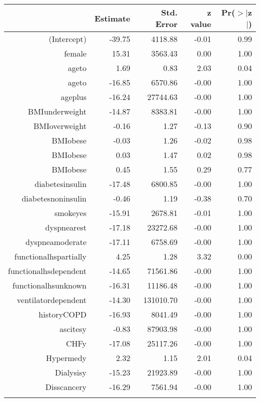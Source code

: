 \bigskip\bigskip
\centering
\begin{tabular}{rrrrr}
  \hline
 & Estimate & Std. Error & z value & Pr($>$$|$z$|$) \\ 
  \hline
(Intercept) & -39.75 & 4118.88 & -0.01 & 0.99 \\ 
  female & 15.31 & 3563.43 & 0.00 & 1.00 \\ 
  age\-65\-to\-74 & 1.69 & 0.83 & 2.03 & 0.04 \\ 
  age\-75\-to\-84 & -16.85 & 6570.86 & -0.00 & 1.00 \\ 
  age\-85\-plus & -16.24 & 27744.63 & -0.00 & 1.00 \\ 
  BMI\-underweight & -14.87 & 8383.81 & -0.00 & 1.00 \\ 
  BMI\-overweight & -0.16 & 1.27 & -0.13 & 0.90 \\ 
  BMI\-obese\-1 & -0.03 & 1.26 & -0.02 & 0.98 \\ 
  BMI\-obese\-2 & 0.03 & 1.47 & 0.02 & 0.98 \\ 
  BMI\-obese\-3 & 0.45 & 1.55 & 0.29 & 0.77 \\ 
  diabetes\-insulin & -17.48 & 6800.85 & -0.00 & 1.00 \\ 
  diabetes\-noninsulin & -0.46 & 1.19 & -0.38 & 0.70 \\ 
  smoke\-yes & -15.91 & 2678.81 & -0.01 & 1.00 \\ 
  dyspnea\-rest & -17.18 & 23272.68 & -0.00 & 1.00 \\ 
  dyspnea\-moderate & -17.11 & 6758.69 & -0.00 & 1.00 \\ 
  functional\-hs\-partially & 4.25 & 1.28 & 3.32 & 0.00 \\ 
  functional\-hs\-dependent & -14.65 & 71561.86 & -0.00 & 1.00 \\ 
  functional\-hs\-unknown & -16.31 & 11186.48 & -0.00 & 1.00 \\ 
  ventilator\-dependent & -14.30 & 131010.70 & -0.00 & 1.00 \\ 
  history\-COPD & -16.93 & 8041.49 & -0.00 & 1.00 \\ 
  ascites\-y & -0.83 & 87903.98 & -0.00 & 1.00 \\ 
  CHF\-y & -17.08 & 25117.26 & -0.00 & 1.00 \\ 
  Hyper\-med\-y & 2.32 & 1.15 & 2.01 & 0.04 \\ 
  Dialysis\-y & -15.23 & 21923.89 & -0.00 & 1.00 \\ 
  Diss\-cancer\-y & -16.29 & 7561.94 & -0.00 & 1.00 \\ 
$$
\end{tabular}
